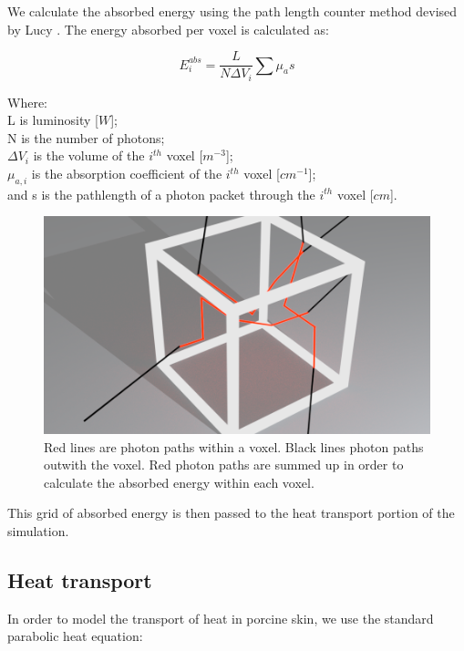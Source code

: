 We calculate the absorbed energy using the path length counter method devised by Lucy \cite{lucy1999computing}. The energy absorbed per voxel is calculated as:

\begin{equation}
E_{i}^{abs} = \frac{L}{N \Delta V_i}\sum\mu_a s
\label{eqn:Eabs}
\end{equation}

\noindent Where:\\ 
	\indent L is luminosity [$W$];\\
	\indent N is the number of photons;\\
	\indent $\Delta V_i$ is the volume of the $i^{th}$ voxel [$m^{-3}$];\\
	\indent $\mu_{a,i}$ is the absorption coefficient of the $i^{th}$ voxel [$cm^{-1}$];\\
	\indent and s is the pathlength of a photon packet through the $i^{th}$ voxel [$cm$].\\
	
\begin{figure}
\centering
\includegraphics[scale=0.25]{./ablation/images/jmea-explain.png}
\caption{Red lines are photon paths within a voxel. Black lines photon paths outwith the voxel. Red photon paths are summed up in order to calculate the absorbed energy within each voxel.}
\label{fig:jmea-explain}
\end{figure}	
		
This grid of absorbed energy is then passed to the heat transport portion of the simulation.

\subsection{Heat transport}

In order to model the transport of heat in porcine skin, we use the standard parabolic heat equation:

